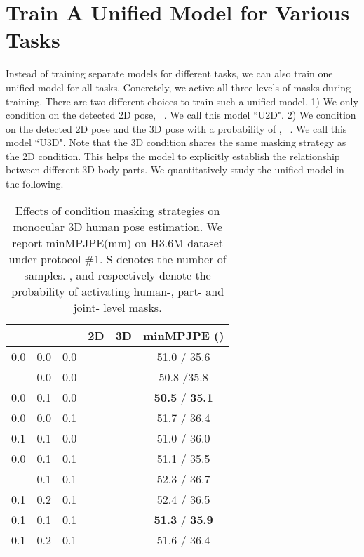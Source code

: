 \documentclass[10pt,twocolumn,letterpaper]{article}
\newcommand{\cmark}{\ding{51}}\newcommand{\xmark}{\ding{55}}
\begin{document}
\section{Train A Unified Model for Various Tasks}
Instead of training separate models for different tasks, we can also train one unified model for all tasks. Concretely, we active all three levels of masks during training. There are two different choices to train such a unified model. 1) We only condition on the detected 2D pose, \ie \ . We call this model ``U2D". 2) We condition on the detected 2D pose  and the 3D pose with a probability of , \ie \ . We call this model ``U3D". Note that the 3D condition shares the same masking strategy as the 2D condition. This helps the model to explicitly establish the relationship between different 3D body parts. We quantitatively study the unified model in the following.

\begin{table}[t]
    \centering
    \small
\begin{tabular}{c c c c c c}
            \toprule
             &  &  & 2D & 3D & minMPJPE () \\
            \midrule
            0.0 & 0.0 & 0.0 & \cmark & \xmark & 51.0 / 35.6  \\
            \hdashline
            0.1 & 0.0 & 0.0 & \cmark & \xmark & 50.8 /35.8   \\
            0.0 & 0.1 & 0.0 & \cmark & \xmark & \textbf{50.5} / \textbf{35.1} \\
            0.0 & 0.0 & 0.1 & \cmark & \xmark & 51.7 / 36.4 \\
            0.1 & 0.1 & 0.0 & \cmark & \xmark & 51.0 / 36.0 \\
            0.0 & 0.1 & 0.1 & \cmark & \xmark & 51.1 / 35.5 \\
            \hdashline
            0.1 & 0.1 & 0.1 & \cmark & \xmark & 52.3 / 36.7 \\
            0.1 & 0.2 & 0.1 & \cmark & \xmark & 52.4 / 36.5 \\
            0.1 & 0.1 & 0.1 & \cmark & \cmark & \textbf{51.3} / \textbf{35.9}  \\
            0.1 & 0.2 & 0.1 & \cmark & \cmark & 51.6 / 36.4  \\
            \bottomrule
        \end{tabular}
\caption{Effects of condition masking strategies on monocular 3D human pose estimation. We report minMPJPE(mm) on H3.6M dataset under protocol \#1. S denotes the number of samples. ,  and  respectively denote the probability of activating human-, part- and joint- level masks.}
    \label{table:supp_cond_masking}
\end{table}
\end{document}
